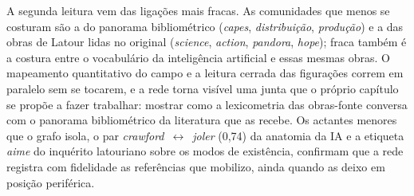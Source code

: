 A segunda leitura vem das ligações mais fracas. As comunidades que menos
se costuram são a do panorama bibliométrico (\textit{capes},
\textit{distribuição}, \textit{produção}) e a das obras de Latour lidas
no original (\textit{science}, \textit{action}, \textit{pandora},
\textit{hope}); fraca também é a costura entre o vocabulário da
inteligência artificial e essas mesmas obras. O mapeamento quantitativo
do campo e a leitura cerrada das figurações correm em paralelo sem se
tocarem, e a rede torna visível uma junta que o próprio capítulo se
propõe a fazer trabalhar: mostrar como a lexicometria das obras-fonte
conversa com o panorama bibliométrico da literatura que as recebe. Os
actantes menores que o grafo isola, o par
\textit{crawford}~$\leftrightarrow$~\textit{joler} (0,74) da
anatomia da IA e a etiqueta \textit{aime} do inquérito latouriano sobre
os modos de existência, confirmam que a rede registra com fidelidade as
referências que mobilizo, ainda quando as deixo em posição periférica.
